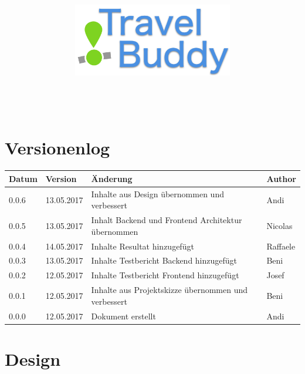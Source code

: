 \documentclass[a4paper,10pt,xetex]{article}
\title{
  \includegraphics[width=7cm]{travel-buddy_white}\\[\bigskipamount]
  \documenttitle\\[\bigskipamount]
}
\author{\documentauthors}
\date{\parbox{\linewidth}{\centering%
  IT15TA ZH \hspace*{3cm} Gruppe 3\endgraf\bigskip
  Dokumentversion \documentversion, \documentdate\endgraf
}}
\begin{document}

\maketitle\newpage

{
\hypersetup{linkcolor=black}
\setcounter{tocdepth}{4}
\tableofcontents
}

\newpage

\section{Versionenlog}\label{versionenlog}

\tabulinesep=1.2mm

\begin{longtabu} to \textwidth { | l | l | X[l] | l | }
  \hline
  \textbf{Datum} & \textbf{Version} & \textbf{Änderung} & \textbf{Author} \\
  \hline
  \endhead

  0.0.6 & 13.05.2017 & Inhalte aus Design übernommen und verbessert & Andi\\
  \hline

  0.0.5 & 13.05.2017 & Inhalt Backend und Frontend Architektur übernommen & Nicolas\\
  \hline

  0.0.4 & 14.05.2017 & Inhalte Resultat hinzugefügt & Raffaele\\
  \hline

  0.0.3 & 13.05.2017 & Inhalte Testbericht Backend hinzugefügt & Beni\\
  \hline

  0.0.2 & 12.05.2017 & Inhalte Testbericht Frontend hinzugefügt & Josef\\
  \hline

  0.0.1 & 12.05.2017 & Inhalte aus Projektskizze übernommen und verbessert & Beni\\
  \hline

  0.0.0 & 12.05.2017 & Dokument erstellt & Andi\\
  \hline
\end{longtabu}
\newpage



% 

\section{Design}


\end{document}
